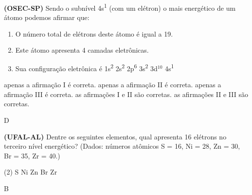 \documentclass[9 pt]{scrartcl}
\def\PQ{0.84} %
\begin{document}

\begin{exercise}[points=\PQ]
\textbf{(OSEC-SP)} Sendo o subnível 4s\textsuperscript{1} (com um elétron) o mais energético de um átomo podemos afirmar que:

\begin{enumerate}[label=\Roman*]
\item O número total de elétrons deste átomo é igual a 19.
\item Este átomo apresenta 4 camadas eletrônicas.
\item Sua configuração eletrônica é  1s\textsuperscript{2} 2s\textsuperscript{2} 2p\textsuperscript{6} 3s\textsuperscript{2} 3d$^10$ 4s\textsuperscript{1}
\end{enumerate}

\begin{choice}
\choice  apenas a afirmação I é correta.
\choice  apenas a afirmação II é correta.
\choice  apenas a afirmação III é correta.
\choice as afirmações I e II são corretas.
\choice as afirmações II e III são corretas.
\end{choice}
\end{exercise}
\begin{solution}
D
\end{solution}



\begin{exercise}[points=\PQ]
\textbf{(UFAL-AL)} Dentre os seguintes elementos, qual apresenta 16 elétrons no terceiro nível energético? (Dados: números atômicos S = 16, Ni = 28, Zn = 30, Br = 35, Zr = 40.)

\begin{choice}(2)
\choice S
\choice Ni
\choice Zn
\choice Br
\choice Zr
\end{choice}
\end{exercise}
\begin{solution}
B
\end{solution}
\end{document}
